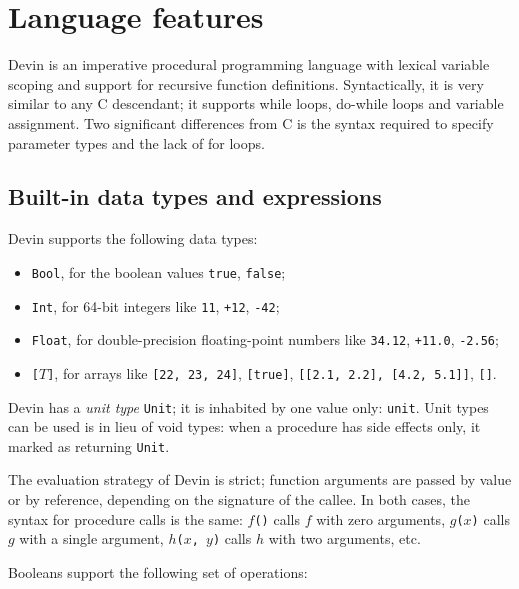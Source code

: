 \documentclass[11pt, american, draft]{PhdThesis}
\begin{document}
  \section{Language features}

  Devin is an imperative procedural programming language with lexical variable scoping and support
  for recursive function definitions. Syntactically, it is very similar to any C descendant; it
  supports while loops, do-while loops and variable assignment. Two significant differences from C
  is the syntax required to specify parameter types and the lack of for loops.

  \subsection{Built-in data types and expressions}

  Devin supports the following data types:

  \begin{itemize}[noitemsep,topsep=0pt]
    \item \verb$Bool$, for the boolean values \verb$true$, \verb$false$;

    \item \verb$Int$, for 64-bit integers like \verb$11$, \verb$+12$, \verb$-42$;

    \item \verb$Float$, for double-precision floating-point numbers like \verb$34.12$, \verb$+11.0$,
          \verb$-2.56$;

    \item \mbox{\texttt{[$T$]}}, for arrays like \verb$[22, 23, 24]$, \verb$[true]$,
          \verb$[[2.1, 2.2], [4.2, 5.1]]$, \verb$[]$.
  \end{itemize}

  Devin has a \emph{unit type} \verb$Unit$; it is inhabited by one value only: \verb$unit$. Unit
  types can be used is in lieu of void types: when a procedure has side effects only, it marked as
  returning \verb$Unit$.

  The evaluation strategy of Devin is strict; function arguments are passed by value or by
  reference, depending on the signature of the callee. In both cases, the syntax for procedure
  calls is the same: \mbox{\texttt{$f$()}} calls $f$ with zero arguments, \mbox{\texttt{$g$($x$)}}
  calls $g$ with a single argument, \mbox{\texttt{$h$($x$, $y$)}} calls $h$ with two
  arguments, etc.

  Booleans support the following set of operations:
\end{document}
